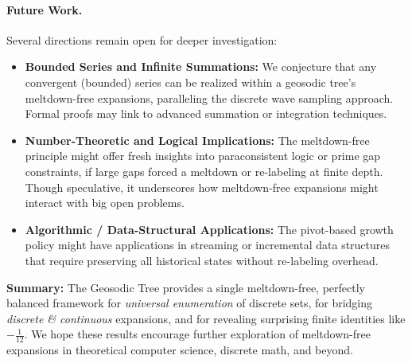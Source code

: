 \documentclass[11pt]{article}
\theoremstyle{definition}
\theoremstyle{remark}
\begin{document}
\paragraph{Future Work.}
Several directions remain open for deeper investigation:
\begin{itemize}
  \item \textbf{Bounded Series and Infinite Summations:}
    We conjecture that any convergent (bounded) series can be realized
    within a geosodic tree’s meltdown-free expansions, paralleling
    the discrete wave sampling approach. Formal proofs may link to advanced
    summation or integration techniques.
  \item \textbf{Number-Theoretic and Logical Implications:}
    The meltdown-free principle might offer fresh insights into paraconsistent
    logic or prime gap constraints, if large gaps forced a meltdown or re-labeling
    at finite depth. Though speculative, it underscores how meltdown-free expansions
    might interact with big open problems.
  \item \textbf{Algorithmic / Data-Structural Applications:}
    The pivot-based growth policy might have applications in streaming or
    incremental data structures that require preserving all historical states
    without re-labeling overhead. 
\end{itemize}

\smallskip
\noindent
\textbf{Summary:} 
The Geosodic Tree provides a single meltdown-free, perfectly balanced framework
for \emph{universal enumeration} of discrete sets, for bridging \emph{discrete
\& continuous} expansions, and for revealing surprising finite identities like
$-\tfrac{1}{12}$. We hope these results encourage further exploration of 
meltdown-free expansions in theoretical computer science, discrete math, 
and beyond.
 




\end{document}
